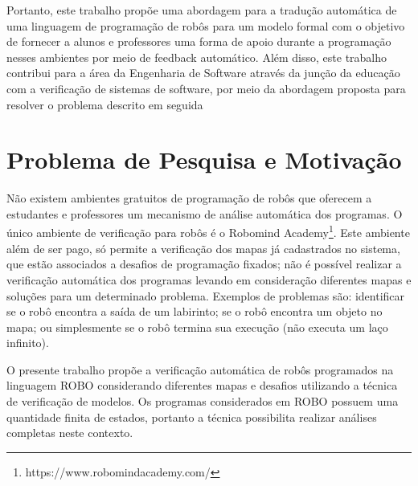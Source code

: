 Portanto, este trabalho propõe uma abordagem para a tradução automática de uma linguagem de programação de robôs para um modelo formal com o objetivo de fornecer a alunos e professores uma forma de apoio durante a programação nesses ambientes por meio de feedback automático. Além disso, este trabalho contribui para a área da Engenharia de Software através da junção da educação com a verificação de sistemas de software, por meio da abordagem proposta para resolver o problema descrito em seguida


\section{Problema de Pesquisa e Motivação}
Não existem ambientes gratuitos de programação de robôs que oferecem a estudantes e professores um mecanismo de análise automática dos programas. O único ambiente de verificação para robôs é o Robomind Academy\footnote{https://www.robomindacademy.com/}. Este ambiente além de ser pago, só permite a verificação dos mapas já cadastrados no sistema, que estão associados a desafios de programação fixados; não é possível realizar a verificação automática dos programas levando em consideração diferentes mapas e soluções para um determinado problema. Exemplos de problemas são: identificar se o robô encontra a saída de um labirinto; se o robô encontra um objeto no mapa; ou simplesmente se o robô termina sua execução (não executa um laço infinito).



O presente trabalho propõe a verificação automática de robôs programados na linguagem ROBO considerando diferentes mapas e desafios utilizando a técnica de verificação de modelos. Os programas considerados em ROBO possuem uma quantidade finita de estados, portanto a técnica possibilita realizar análises completas neste contexto.

